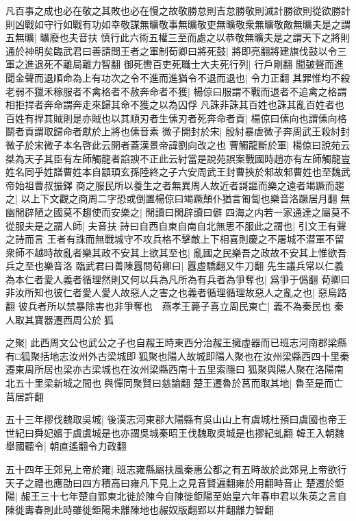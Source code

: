 凡百事之成也必在敬之其敗也必在慢之故敬勝怠則吉怠勝敬則滅計勝欲則從欲勝計則凶戰如守行如戰有功如幸敬謀無曠敬事無曠敬吏無曠敬衆無曠敬敵無曠夫是之謂五無曠|{
	曠廢也夫音扶}
慎行此六術五權三至而處之以恭敬無曠夫是之謂天下之將則通於神明矣臨武君曰善請問王者之軍制荀卿曰將死鼓|{
	將即亮翻將建旗伐鼓以令三軍之進退死不離局離力智翻}
御死轡百吏死職士大夫死行列|{
	行戶剛翻}
聞皷聲而進聞金聲而退順命為上有功次之令不進而進猶令不退而退也|{
	令力正翻}
其罪惟均不殺老弱不獵禾稼服者不禽格者不赦奔命者不獲|{
	楊倞曰服謂不戰而退者不追禽之格謂相拒捍者奔命謂奔走來歸其命不獲之以為囚俘}
凡誅非誅其百姓也誅其亂百姓者也百姓有捍其賊則是亦賊也以其順刃者生傃刃者死奔命者貢|{
	楊倞曰傃向也謂傃向格鬬者貢謂取歸命者獻於上將也傃音素}
微子開封於宋|{
	殷紂暴虐微子奔周武王殺紂封微子於宋微子本名啓此云開者蓋漢景帝諱劉向改之也}
曹觸龍斷於軍|{
	楊倞曰說苑云桀為天子其臣有左師觸龍者諂諛不正此云紂當是說苑誤案戰國時趙亦有左師觸龍豈姓名同乎姓譜曹姓本自顓頊玄孫陸終之子六安周武王封曹挾於邾故邾曹姓也至魏武帝始祖曹叔振鐸}
商之服民所以養生之者無異周人故近者謌謳而樂之遠者竭蹶而趨之|{
	以上下文觀之商周二字恐或倒置楊倞曰竭蹶顛仆猶言匍匐也樂音洛蹶居月翻}
無幽閒辟陋之國莫不趨使而安樂之|{
	閒讀曰閑辟讀曰僻}
四海之内若一家通達之屬莫不從服夫是之謂人師|{
	夫音扶}
詩曰自西自東自南自北無思不服此之謂也|{
	引文王有聲之詩而言}
王者有誅而無戰城守不攻兵格不擊敵上下相喜則慶之不屠城不潜軍不留衆師不越時故亂者樂其政不安其上欲其至也|{
	亂國之民樂吾之政故不安其上惟欲吾兵之至也樂音洛}
臨武君曰善陳囂問荀卿曰|{
	囂虛驕翻又牛刀翻}
先生議兵常以仁義為本仁者愛人義者循理然則又何以兵為凡所為有兵者為爭奪也|{
	爲爭于僞翻}
荀卿曰非汝所知也彼仁者愛人愛人故惡人之害之也義者循理循理故惡人之亂之也|{
	惡烏路翻}
彼兵者所以禁暴除害也非爭奪也　燕孝王薨子喜立周民東亡|{
	義不為秦民也}
秦人取其寶器遷西周公於狐

之聚|{
	此西周文公也武公之子也自赧王時東西分治赧王擁虛器而已班志河南郡梁縣有□狐聚括地志汝州外古梁城即狐聚也陽人故城即陽人聚也在汝州梁縣西四十里秦遷東周所居也梁亦古梁城也在汝州梁縣西南十五里索隱曰狐聚與陽人聚在洛陽南北五十里梁新城之間也與憚同聚賢曰慈諭翻}
楚王遷魯於莒而取其地|{
	魯至是而亡莒居許翻}


五十三年摎伐魏取吳城|{
	後漢志河東郡大陽縣有吳山山上有虞城杜預曰虞國也帝王世紀曰舜妃嬪于虞虞城是也亦謂吳城秦昭王伐魏取吳城是也摎紀虬翻}
韓王入朝魏舉國聽令|{
	朝直遙翻令力政翻}


五十四年王郊見上帝於雍|{
	班志雍縣屬扶風秦惠公都之有五畤故於此郊見上帝欲行天子之禮也應劭曰四方積高曰雍凡下見上之見音賢遍翻雍於用翻畤音止}
楚遷於鉅陽|{
	赧王三十七年楚自郢東北徙於陳今自陳徙鉅陽至始皇六年春申君以朱英之言自陳徙夀春則此時雖徙鉅陽未離陳地也赧奴版翻郢以井翻離力智翻}


